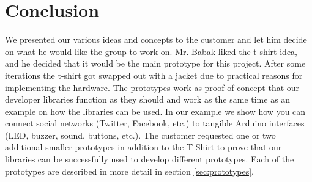 \newpage

\section{Conclusion}
We presented our various ideas and concepts to the customer and let him decide on what he would
like the group to work on. Mr. Babak liked the t-shirt idea, and he decided that it would be the main prototype for this project. 
After some iterations the t-shirt got swapped out with a jacket due to practical reasons for implementing the hardware. 
The prototypes work as proof-of-concept that our developer libraries function as they should and work as the same time as an 
example on how the libraries can be used. In our example we show how you can connect social networks (Twitter, Facebook, etc.) to 
tangible Arduino interfaces (LED, buzzer, sound, buttons, etc.). The customer requested one or two additional smaller prototypes in 
addition to the T-Shirt to prove that our libraries can be successfully used to develop different prototypes. Each of the prototypes are 
described in more detail in section \ref{sec:prototypes}.
